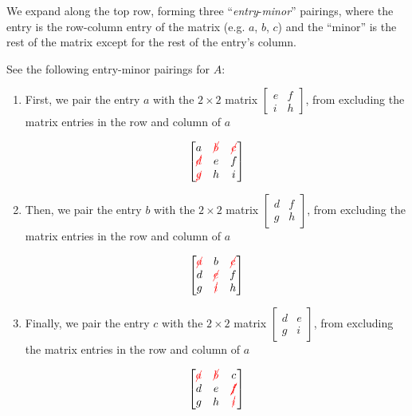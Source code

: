 \documentclass{ximera}
\begin{document}
We expand along the top row, forming three ``\emph{entry}-\emph{minor}'' pairings, where the entry is the row-column entry of the matrix (e.g. $a$, $b$, $c$) and the ``minor'' is the rest of the matrix except for the rest of the entry's column. 

See the following entry-minor pairings for $A$:

\begin{enumerate}
    \item First, we pair the entry $a$ with the $2\times 2$ matrix $\begin{bmatrix}
        e&f\\i&h
    \end{bmatrix}$, from excluding the matrix entries in the row and column of $a$

    \[
    \begin{bmatrix}
    a & \textcolor{red}{\cancel{b}} & \textcolor{red}{\cancel{c}} \\
    \textcolor{red}{\cancel{d}} & e & f \\
    \textcolor{red}{\cancel{g}} & h & i
    \end{bmatrix}
    \]

    \item Then, we pair the entry $b$ with the $2\times 2$ matrix $\begin{bmatrix}
        d&f\\g&h
    \end{bmatrix}$, from excluding the matrix entries in the row and column of $a$

    \[
    \begin{bmatrix}
    \textcolor{red}{\cancel{a}} & b & \textcolor{red}{\cancel{c}} \\
    d & \textcolor{red}{\cancel{e}} & f \\
    g & \textcolor{red}{\cancel{i}} & h
    \end{bmatrix}
    \]

    \item Finally, we pair the entry $c$ with the $2\times 2$ matrix $\begin{bmatrix}
        d&e\\g&i
    \end{bmatrix}$, from excluding the matrix entries in the row and column of $a$

    \[
    \begin{bmatrix}
    \textcolor{red}{\cancel{a}} & \textcolor{red}{\cancel{b}} & c \\
    d & e & \textcolor{red}{\cancel{f}} \\
    g & h & \textcolor{red}{\cancel{i}}
    \end{bmatrix}
    \]

\end{enumerate}
\end{document}
